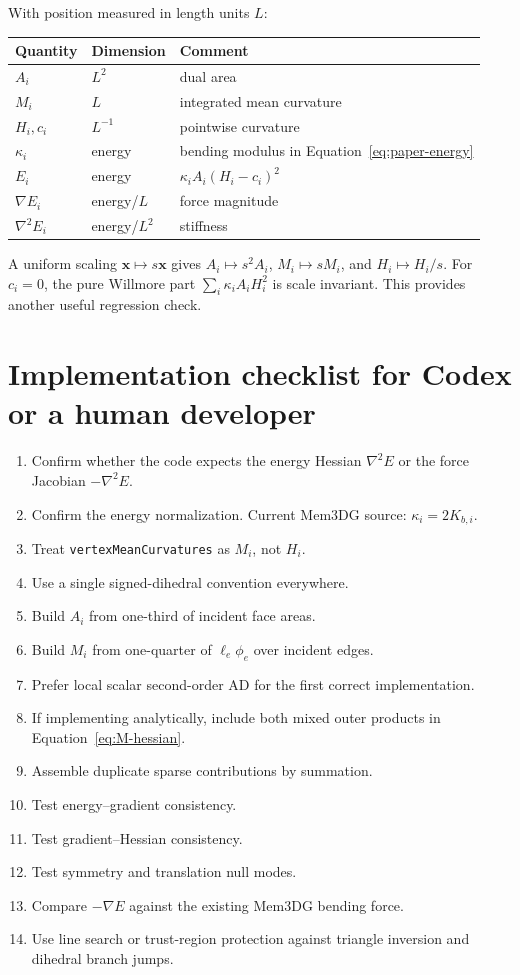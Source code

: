 \documentclass[11pt]{article}
\newcommand{\grad}{\nabla}
\newcommand{\Hess}{\nabla^2}
\newcommand{\x}{\mathbf{x}}
\begin{document}
With position measured in length units $L$:
\begin{center}
\begin{tabular}{lll}
\toprule
Quantity & Dimension & Comment\\
\midrule
$A_i$ & $L^2$ & dual area\\
$M_i$ & $L$ & integrated mean curvature\\
$H_i,c_i$ & $L^{-1}$ & pointwise curvature\\
$\kappa_i$ & energy & bending modulus in Equation~\eqref{eq:paper-energy}\\
$E_i$ & energy & $\kappa_iA_i(H_i-c_i)^2$\\
$\grad E_i$ & energy/$L$ & force magnitude\\
$\Hess E_i$ & energy/$L^2$ & stiffness\\
\bottomrule
\end{tabular}
\end{center}
A uniform scaling $\x\mapsto s\x$ gives $A_i\mapsto s^2A_i$, $M_i\mapsto sM_i$, and $H_i\mapsto H_i/s$.  For $c_i=0$, the pure Willmore part $\sum_i\kappa_iA_iH_i^2$ is scale invariant.  This provides another useful regression check.

\section{Implementation checklist for Codex or a human developer}

\begin{enumerate}
  \item Confirm whether the code expects the energy Hessian $\Hess E$ or the force Jacobian $-\Hess E$.
  \item Confirm the energy normalization.  Current Mem3DG source: $\kappa_i=2K_{b,i}$.
  \item Treat \texttt{vertexMeanCurvatures} as $M_i$, not $H_i$.
  \item Use a single signed-dihedral convention everywhere.
  \item Build $A_i$ from one-third of incident face areas.
  \item Build $M_i$ from one-quarter of $\ell_e\phi_e$ over incident edges.
  \item Prefer local scalar second-order AD for the first correct implementation.
  \item If implementing analytically, include both mixed outer products in Equation~\eqref{eq:M-hessian}.
  \item Assemble duplicate sparse contributions by summation.
  \item Test energy--gradient consistency.
  \item Test gradient--Hessian consistency.
  \item Test symmetry and translation null modes.
  \item Compare $-\grad E$ against the existing Mem3DG bending force.
  \item Use line search or trust-region protection against triangle inversion and dihedral branch jumps.
\end{enumerate}
\end{document}

